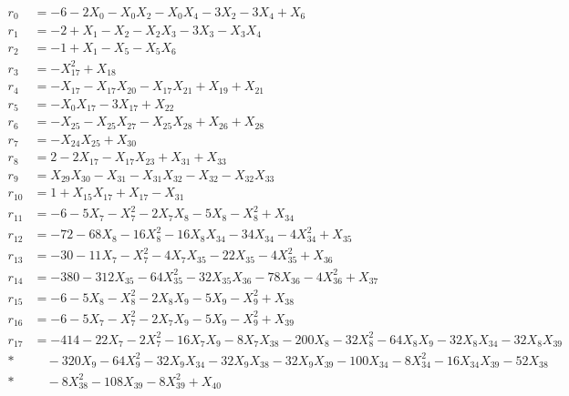 \begingroup\small
\setlength{\jot}{2pt}
\allowdisplaybreaks[4]
\begin{align*}
r_{0} &= -6 - 2X_{0} - X_{0}X_{2} - X_{0}X_{4} - 3X_{2} - 3X_{4} + X_{6} \\[3pt]
r_{1} &= -2 + X_{1} - X_{2} - X_{2}X_{3} - 3X_{3} - X_{3}X_{4} \\[3pt]
r_{2} &= -1 + X_{1} - X_{5} - X_{5}X_{6} \\[3pt]
r_{3} &= -X_{17}^{2} + X_{18} \\[3pt]
r_{4} &= -X_{17} - X_{17}X_{20} - X_{17}X_{21} + X_{19} + X_{21} \\[3pt]
r_{5} &= -X_{0}X_{17} - 3X_{17} + X_{22} \\[3pt]
r_{6} &= -X_{25} - X_{25}X_{27} - X_{25}X_{28} + X_{26} + X_{28} \\[3pt]
r_{7} &= -X_{24}X_{25} + X_{30} \\[3pt]
r_{8} &= 2 - 2X_{17} - X_{17}X_{23} + X_{31} + X_{33} \\[3pt]
r_{9} &= X_{29}X_{30} - X_{31} - X_{31}X_{32} - X_{32} - X_{32}X_{33} \\[3pt]
r_{10} &= 1 + X_{15}X_{17} + X_{17} - X_{31} \\[3pt]
r_{11} &= -6 - 5X_{7} - X_{7}^{2} - 2X_{7}X_{8} - 5X_{8} - X_{8}^{2} + X_{34} \\[3pt]
r_{12} &= -72 - 68X_{8} - 16X_{8}^{2} - 16X_{8}X_{34} - 34X_{34} - 4X_{34}^{2} + X_{35} \\[3pt]
r_{13} &= -30 - 11X_{7} - X_{7}^{2} - 4X_{7}X_{35} - 22X_{35} - 4X_{35}^{2} + X_{36} \\[3pt]
r_{14} &= -380 - 312X_{35} - 64X_{35}^{2} - 32X_{35}X_{36} - 78X_{36} - 4X_{36}^{2} + X_{37} \\[3pt]
r_{15} &= -6 - 5X_{8} - X_{8}^{2} - 2X_{8}X_{9} - 5X_{9} - X_{9}^{2} + X_{38} \\[3pt]
r_{16} &= -6 - 5X_{7} - X_{7}^{2} - 2X_{7}X_{9} - 5X_{9} - X_{9}^{2} + X_{39} \\[3pt]
r_{17} &= -414 - 22X_{7} - 2X_{7}^{2} - 16X_{7}X_{9} - 8X_{7}X_{38} - 200X_{8} - 32X_{8}^{2} - 64X_{8}X_{9} - 32X_{8}X_{34} - 32X_{8}X_{39} \\*
&\quad  - 320X_{9} - 64X_{9}^{2} - 32X_{9}X_{34} - 32X_{9}X_{38} - 32X_{9}X_{39} - 100X_{34} - 8X_{34}^{2} - 16X_{34}X_{39} - 52X_{38} \\*
&\quad  - 8X_{38}^{2} - 108X_{39} - 8X_{39}^{2} + X_{40} \\[3pt]

\end{align*}
